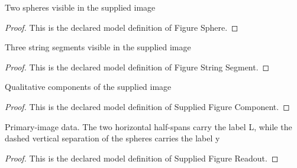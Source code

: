 \begin{definition}
  \label{def:physics:phyx-mini-0234:phyxminiproblems-problemphyxmini0234-figuresphere}
  Two spheres visible in the supplied image
\end{definition}
\begin{proof}
  This is the declared model definition of Figure Sphere.
\end{proof}
\begin{definition}
  \label{def:physics:phyx-mini-0234:phyxminiproblems-problemphyxmini0234-figurestringsegment}
  Three string segments visible in the supplied image
\end{definition}
\begin{proof}
  This is the declared model definition of Figure String Segment.
\end{proof}
\begin{definition}
  \label{def:physics:phyx-mini-0234:phyxminiproblems-problemphyxmini0234-suppliedfigurecomponent}
  Qualitative components of the supplied image
\end{definition}
\begin{proof}
  This is the declared model definition of Supplied Figure Component.
\end{proof}
\begin{definition}
  \label{def:physics:phyx-mini-0234:phyxminiproblems-problemphyxmini0234-suppliedfigurereadout}
  Primary-image data. The two horizontal half-spans carry the label L, while the dashed vertical separation of the spheres carries the label y
\end{definition}
\begin{proof}
  This is the declared model definition of Supplied Figure Readout.
\end{proof}
